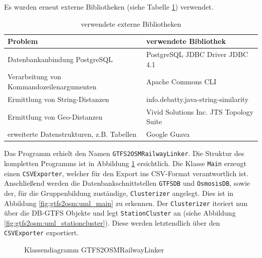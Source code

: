 Es wurden erneut externe Bibliotheken (siehe Tabelle \ref{tab:GTFS2OSM:Libraries}) verwendet.
\begin{table}[htb]
\small
\centering
\caption{verwendete externe Bibliotheken}
\label{tab:GTFS2OSM:Libraries}
\begin{tabular}{|l|l|}
\hline
\textbf{Problem}                          & \textbf{verwendete Bibliothek}     \\ \hline
Datenbankanbindung PostgreSQL             & PostgreSQL JDBC Driver JDBC 4.1    \\ \hline
Verarbeitung von Kommandozeilenargumenten & Apache Commons CLI                 \\ \hline
Ermittlung von String-Distanzen           & info.debatty.java-string-similarity         \\ \hline
Ermittlung von Geo-Distanzen           & Vivid Solutions Inc. JTS Topology Suite         \\ \hline
erweiterte Datenstrukturen, z.B. Tabellen & Google Guava          \\ \hline
\end{tabular}
\end{table}

Das Programm erhielt den Namen \texttt{GTFS2OSMRailwayLinker}.
Die Struktur des kompletten Programms ist in Abbildung \ref{fig:gtfs2osm:uml_full} ersichtlich.
Die Klasse \texttt{Main} erzeugt einen \texttt{CSVExporter}, welcher für den Export ins CSV-Format verantwortlich ist.
Anschließend werden die Datenbankschnittstellen \texttt{GTFSDB} und \texttt{OsmosisDB}, sowie der, für die Gruppenbildung zuständige, \texttt{Clusterizer} angelegt.
Dies ist in Abbildung \ref{fig:gtfs2osm:uml_main} zu erkennen.
Der \texttt{Clusterizer} iteriert nun über die DB-GTFS Objekte und legt \texttt{StationCluster} an (siehe Abbildung \ref{fig:gtfs2osm:uml_stationcluster}).
Diese werden letztendlich über den \texttt{CSVExporter} exportiert.

\begin{figure}[H]
   \centering
   \caption{Klassendiagramm GTFS2OSMRailwayLinker}
   \label{fig:gtfs2osm:uml_full}
 \end{figure}

